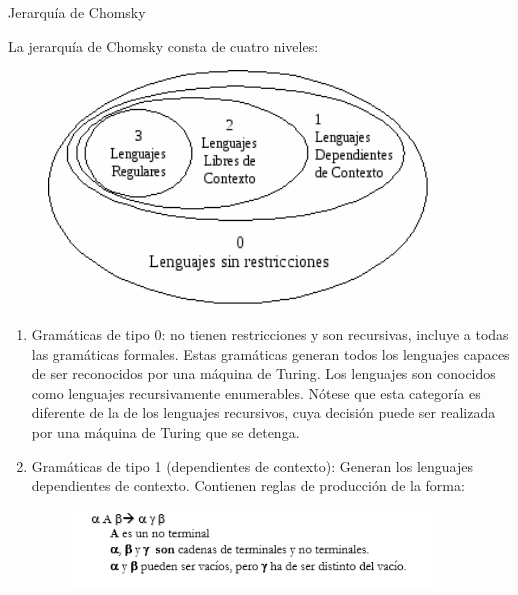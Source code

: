 \documentclass[a4paper,12pt]{letter}%
\begin{document}
\begin{letter}%
{Jerarqu\'ia de Chomsky\\
}
\opening{}


La jerarqu\'ia de Chomsky consta de cuatro niveles:
\begin{center}
\begin{figure}
\includegraphics[width=0.9\textwidth]{Jerarquia_Chomsky.png} 
\centering
\end{figure}
\end{center}
\begin{enumerate}
  \item Gram\'aticas de tipo 0: no tienen restricciones y son recursivas, incluye a todas las gram\'aticas formales. Estas gram\'aticas generan todos los lenguajes capaces de ser reconocidos por una m\'aquina de Turing. Los lenguajes son conocidos como lenguajes recursivamente enumerables. N\'otese que esta categor\'ia es diferente de la de los lenguajes recursivos, cuya decisi\'on puede ser realizada por una m\'aquina de Turing que se detenga.

  \item Gram\'aticas de tipo 1 (dependientes de contexto):
Generan los lenguajes dependientes de contexto. Contienen reglas de producci\'on de la forma:

\begin{center}
\begin{figure}
\includegraphics[width=0.9\textwidth]{tipo1.png} 
\centering
\end{figure}
\end{center}


\end{enumerate}
\end{letter}
\end{document}

